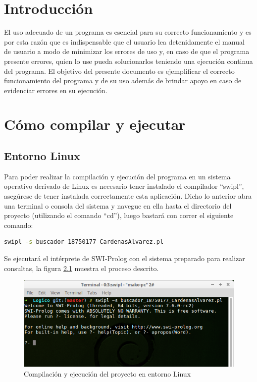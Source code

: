 \documentclass[letterpaper,12pt]{report}
\begin{document}

\chapter {Introducción}
\setcounter{page}{1}

El uso adecuado de un programa es esencial para su correcto funcionamiento y es por esta razón que es indispensable que el usuario lea detenidamente el manual de usuario a modo de minimizar los errores de uso y, en caso de que el programa presente errores, quien lo use pueda solucionarlos teniendo una ejecución continua del programa. El objetivo del presente documento es ejemplificar el correcto funcionamiento del programa y de su uso además de brindar apoyo en caso de evidenciar errores en su ejecución.

\chapter {Cómo compilar y ejecutar}

\section {Entorno Linux}

Para poder realizar la compilación y ejecución del programa en un sistema operativo derivado de Linux es necesario tener instalado el compilador ``swipl'', asegúrese de tener instalada correctamente esta aplicación. Dicho lo anterior abra una terminal o consola del sistema y navegue en ella hasta el directorio del proyecto (utilizando el comando ``cd''), luego bastará con correr el siguiente comando:

\begin{lstlisting}[language=bash]
swipl -s buscador_18750177_CardenasAlvarez.pl
\end{lstlisting}

Se ejecutará el intérprete de SWI-Prolog con el sistema preparado para realizar consultas, la figura \ref{fig:ejecLinux} muestra el proceso descrito.

\begin{figure}[H]
    \centering
    \includegraphics[width=1\textwidth]{ejecLinux.png}
    \caption{Compilación y ejecución del proyecto en entorno Linux}
    \label{fig:ejecLinux}
\end{figure}
\end{document}
